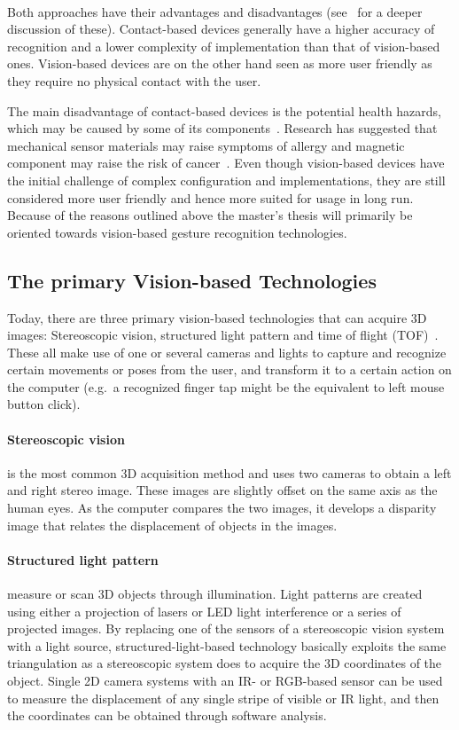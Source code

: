 \paragraph{}Both approaches have their advantages and disadvantages (see~\citet{Rautaray2015} for a deeper discussion of these). Contact-based devices generally have a higher accuracy of recognition and a lower complexity of implementation than that of vision-based ones. Vision-based devices are on the other hand seen as more user friendly as they require no physical contact with the user. 

The main disadvantage of contact-based devices is the potential health hazards, which may be caused by some of its components~\citep{Schultz2003}. Research has suggested that mechanical sensor materials may raise symptoms of allergy and magnetic component may raise the risk of cancer~\citep{Nishikawa2003}. Even though vision-based devices have the initial challenge of complex configuration and implementations, they are still considered more user friendly and hence more suited for usage in long run. Because of the reasons outlined above the master's thesis will primarily be oriented towards vision-based gesture recognition technologies. 

\subsection{The primary Vision-based Technologies}
Today, there are three primary vision-based technologies that can acquire 3D images: Stereoscopic vision, structured light pattern and time of flight (TOF)~\citep{Ko2012}.
These all make use of one or several cameras and lights to capture and recognize certain movements or poses from the user, and transform it to a certain action on the computer (e.g.~a recognized finger tap might be the equivalent to left mouse button click). 

\paragraph{Stereoscopic vision}is the most common 3D acquisition method and uses two cameras to obtain a left and right stereo image. These images are slightly offset on the same axis as the human eyes. As the computer compares the two images, it develops a disparity image that relates the displacement of objects in the images.

\paragraph{Structured light pattern}measure or scan 3D objects through illumination. Light patterns are created using either a projection of lasers or LED light interference or a series of projected images. By
replacing one of the sensors of a stereoscopic vision system with a light source, structured-light-based technology basically exploits the same triangulation as a stereoscopic system does to acquire the 3D coordinates of the object. Single 2D camera systems with an IR- or RGB-based sensor can be used to measure the displacement of any single stripe of visible or IR light, and then the coordinates can be obtained through software analysis.

